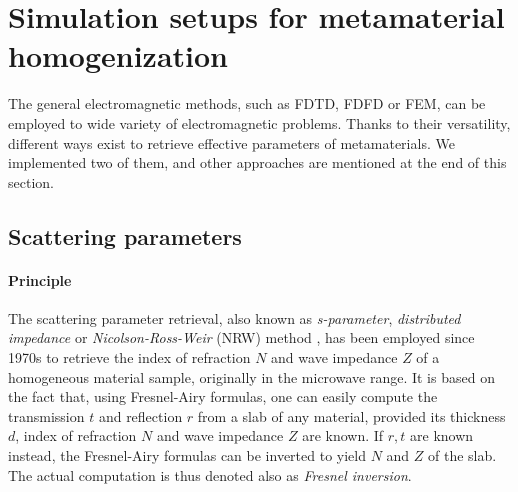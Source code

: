 
\section{Simulation setups for metamaterial homogenization} %

The general electromagnetic methods, such as FDTD, FDFD or FEM, can be employed to wide variety of electromagnetic problems. Thanks to their versatility, different ways exist to retrieve effective parameters of metamaterials. We implemented two of them, and other approaches are mentioned at the end of this section.
\subsection{Scattering parameters}
\paragraph{Principle} %
The scattering parameter retrieval, also known as \textit{s-parameter}, \textit{distributed impedance} or \textit{Nicolson-Ross-Weir} (NRW) method \cite{nicolson1970measurement, weir1974automatic}, has been employed since 1970s to retrieve the index of refraction $N$ and wave impedance $Z$ of a homogeneous material sample, originally in the microwave range. It is based on the fact that, using Fresnel-Airy formulas, %
one can easily compute the transmission $t$ and reflection $r$ from a slab of any material, provided its thickness $d$, index of refraction $N$ and wave impedance $Z$ are known.  If $r,t$ are known instead, the Fresnel-Airy formulas can be inverted to yield $N$ and $Z$ of the slab. The actual computation is thus denoted also as \textit{Fresnel inversion}.


